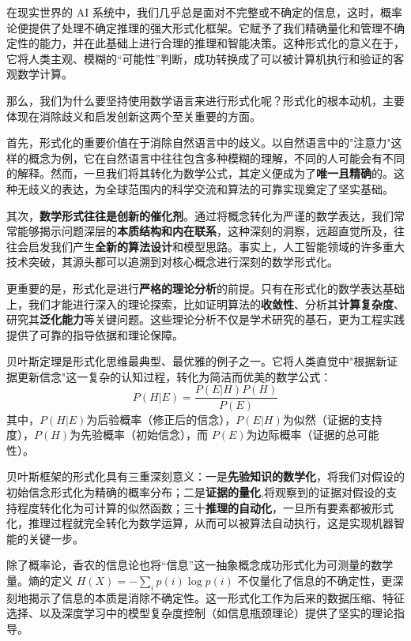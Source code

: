 在现实世界的 AI 系统中，我们几乎总是面对不完整或不确定的信息，这时，概率论便提供了处理不确定推理的强大形式化框架。它赋予了我们精确量化和管理不确定性的能力，并在此基础上进行合理的推理和智能决策。这种形式化的意义在于，它将人类主观、模糊的“可能性”判断，成功转换成了可以被计算机执行和验证的客观数学计算。

那么，我们为什么要坚持使用数学语言来进行形式化呢？形式化的根本动机，主要体现在消除歧义和启发创新这两个至关重要的方面。

首先，形式化的重要价值在于消除自然语言中的歧义。以自然语言中的"注意力"这样的概念为例，它在自然语言中往往包含多种模糊的理解，不同的人可能会有不同的解释。然而，一旦我们将其转化为数学公式，其定义便成为了\textbf{唯一且精确}的。这种无歧义的表达，为全球范围内的科学交流和算法的可靠实现奠定了坚实基础。

其次，\textbf{数学形式往往是创新的催化剂}。通过将概念转化为严谨的数学表达，我们常常能够揭示问题深层的\textbf{本质结构和内在联系}，这种深刻的洞察，远超直觉所及，往往会启发我们产生\textbf{全新的算法设计}和模型思路。事实上，人工智能领域的许多重大技术突破，其源头都可以追溯到对核心概念进行深刻的数学形式化。

更重要的是，形式化是进行\textbf{严格的理论分析}的前提。只有在形式化的数学表达基础上，我们才能进行深入的理论探索，比如证明算法的\textbf{收敛性}、分析其\textbf{计算复杂度}、研究其\textbf{泛化能力}等关键问题。这些理论分析不仅是学术研究的基石，更为工程实践提供了可靠的指导依据和理论保障。

贝叶斯定理是形式化思维最典型、最优雅的例子之一。它将人类直觉中"根据新证据更新信念"这一复杂的认知过程，转化为简洁而优美的数学公式：
$$P(H|E) = \frac{P(E|H)P(H)}{P(E)}$$
其中，$P(H|E)$为后验概率（修正后的信念），$P(E|H)$为似然（证据的支持度），$P(H)$为先验概率（初始信念），而 $P(E)$为边际概率（证据的总可能性）。

贝叶斯框架的形式化具有三重深刻意义：一是\textbf{先验知识的数学化}，将我们对假设的初始信念形式化为精确的概率分布；二是\textbf{证据的量化},将观察到的证据对假设的支持程度转化化为可计算的似然函数；三十\textbf{推理的自动化}，一旦所有要素都被形式化，推理过程就完全转化为数学运算，从而可以被算法自动执行，这是实现机器智能的关键一步。


除了概率论，香农的信息论也将“信息”这一抽象概念成功形式化为可测量的数学量。熵的定义 $H(X) = -\sum_{i} p(i) \log p(i)$ 不仅量化了信息的不确定性，更深刻地揭示了信息的本质是消除不确定性。这一形式化工作为后来的数据压缩、特征选择、以及深度学习中的模型复杂度控制（如信息瓶颈理论）提供了坚实的理论指导。

